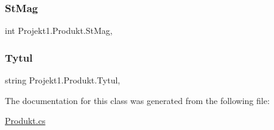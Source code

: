 \mbox{\label{class_projekt1_1_1_produkt_aee1619c7a5300a856be453b5defe11ec}} 
\subsubsection{\texorpdfstring{StMag}{StMag}}
{\footnotesize\ttfamily int Projekt1.\+Produkt.\+St\+Mag\hspace{0.3cm}{\ttfamily [get]}, {\ttfamily [set]}}

\mbox{\label{class_projekt1_1_1_produkt_a6c62f201bf5ab96f43cd8be7a7ae64ab}} 
\subsubsection{\texorpdfstring{Tytul}{Tytul}}
{\footnotesize\ttfamily string Projekt1.\+Produkt.\+Tytul\hspace{0.3cm}{\ttfamily [get]}, {}}



The documentation for this class was generated from the following file\+:\begin{DoxyCompactItemize}
\item 
\mbox{\hyperlink{_produkt_8cs}{Produkt.\+cs}}\end{DoxyCompactItemize}
